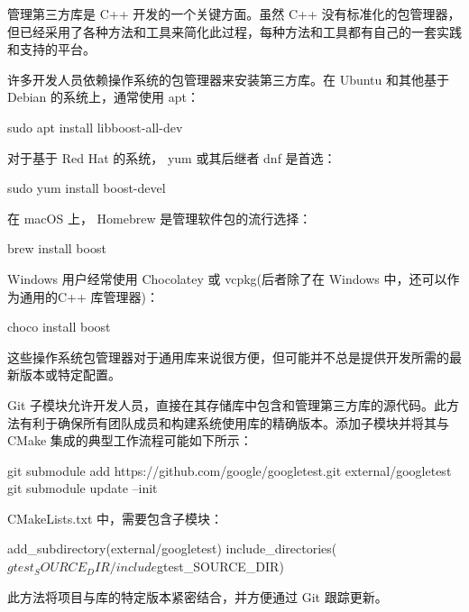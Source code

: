 
管理第三方库是 C++ 开发的一个关键方面。虽然 C++ 没有标准化的包管理器，但已经采用了各种方法和工具来简化此过程，每种方法和工具都有自己的一套实践和支持的平台。


许多开发人员依赖操作系统的包管理器来安装第三方库。在 Ubuntu 和其他基于 Debian 的系统上，通常使用 apt：

\begin{shell}
sudo apt install libboost-all-dev
\end{shell}

对于基于 Red Hat 的系统， yum 或其后继者 dnf 是首选：

\begin{shell}
sudo yum install boost-devel
\end{shell}

在 macOS 上， Homebrew 是管理软件包的流行选择：

\begin{shell}
brew install boost
\end{shell}

Windows 用户经常使用 Chocolatey 或 vcpkg(后者除了在 Windows 中，还可以作为通用的C++ 库管理器)：

\begin{shell}
choco install boost
\end{shell}

这些操作系统包管理器对于通用库来说很方便，但可能并不总是提供开发所需的最新版本或特定配置。


Git 子模块允许开发人员，直接在其存储库中包含和管理第三方库的源代码。此方法有利于确保所有团队成员和构建系统使用库的精确版本。添加子模块并将其与 CMake 集成的典型工作流程可能如下所示：

\begin{shell}
git submodule add https://github.com/google/googletest.git external/googletest
git submodule update --init
\end{shell}

CMakeLists.txt 中，需要包含子模块：

\begin{cmake}
add_subdirectory(external/googletest)
include_directories(${gtest_SOURCE_DIR}/include ${gtest_SOURCE_DIR})
\end{cmake}

此方法将项目与库的特定版本紧密结合，并方便通过 Git 跟踪更新。


